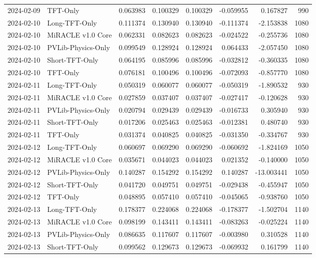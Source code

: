 \begin{tabular}{llrrrrrr}
2024-02-09 & TFT-Only & 0.063983 & 0.100329 & 0.100329 & -0.059955 & 0.167827 & 990 \\
2024-02-10 & Long-TFT-Only & 0.111374 & 0.130940 & 0.130940 & -0.111374 & -2.153838 & 1080 \\
2024-02-10 & MiRACLE v1.0 Core & 0.062331 & 0.082623 & 0.082623 & -0.024522 & -0.255736 & 1080 \\
2024-02-10 & PVLib-Physics-Only & 0.099549 & 0.128924 & 0.128924 & 0.064433 & -2.057450 & 1080 \\
2024-02-10 & Short-TFT-Only & 0.064195 & 0.085996 & 0.085996 & -0.032812 & -0.360335 & 1080 \\
2024-02-10 & TFT-Only & 0.076181 & 0.100496 & 0.100496 & -0.072093 & -0.857770 & 1080 \\
2024-02-11 & Long-TFT-Only & 0.050319 & 0.060077 & 0.060077 & -0.050319 & -1.890532 & 930 \\
2024-02-11 & MiRACLE v1.0 Core & 0.027859 & 0.037407 & 0.037407 & -0.027417 & -0.120628 & 930 \\
2024-02-11 & PVLib-Physics-Only & 0.020794 & 0.029439 & 0.029439 & -0.016733 & 0.305940 & 930 \\
2024-02-11 & Short-TFT-Only & 0.017206 & 0.025463 & 0.025463 & -0.012381 & 0.480740 & 930 \\
2024-02-11 & TFT-Only & 0.031374 & 0.040825 & 0.040825 & -0.031350 & -0.334767 & 930 \\
2024-02-12 & Long-TFT-Only & 0.060697 & 0.069290 & 0.069290 & -0.060692 & -1.824169 & 1050 \\
2024-02-12 & MiRACLE v1.0 Core & 0.035671 & 0.044023 & 0.044023 & 0.021352 & -0.140000 & 1050 \\
2024-02-12 & PVLib-Physics-Only & 0.140287 & 0.154292 & 0.154292 & 0.140287 & -13.003441 & 1050 \\
2024-02-12 & Short-TFT-Only & 0.041720 & 0.049751 & 0.049751 & -0.029438 & -0.455947 & 1050 \\
2024-02-12 & TFT-Only & 0.048895 & 0.057410 & 0.057410 & -0.045065 & -0.938760 & 1050 \\
2024-02-13 & Long-TFT-Only & 0.178377 & 0.224068 & 0.224068 & -0.178377 & -1.502704 & 1140 \\
2024-02-13 & MiRACLE v1.0 Core & 0.098199 & 0.143411 & 0.143411 & -0.083263 & -0.025224 & 1140 \\
2024-02-13 & PVLib-Physics-Only & 0.086635 & 0.117607 & 0.117607 & -0.003980 & 0.310528 & 1140 \\
2024-02-13 & Short-TFT-Only & 0.099562 & 0.129673 & 0.129673 & -0.069932 & 0.161799 & 1140 \\

\end{tabular}
